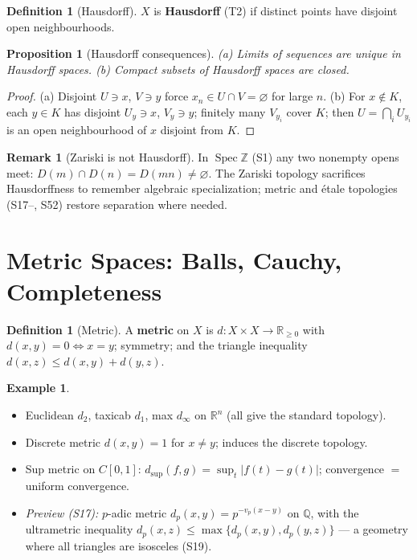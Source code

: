 \documentclass[11pt,a4paper]{article}
\newtheorem{proposition}[theorem]{Proposition}
\theoremstyle{definition}
\newtheorem{definition}[theorem]{Definition}
\newtheorem{example}[theorem]{Example}
\newtheorem{remark}[theorem]{Remark}
\newcommand{\R}{\mathbb{R}}
\newcommand{\Z}{\mathbb{Z}}
\newcommand{\Q}{\mathbb{Q}}
\newcommand{\Spec}{\operatorname{Spec}}
\begin{document}
	\begin{definition}[Hausdorff]
		$X$ is \textbf{Hausdorff} (T2) if distinct points have disjoint open neighbourhoods.
	\end{definition}
	
	\begin{proposition}[Hausdorff consequences]\label{prop:hausdorff}
		(a) Limits of sequences are unique in Hausdorff spaces. (b) Compact subsets of Hausdorff spaces are closed.
	\end{proposition}
	\begin{proof}
		(a) Disjoint $U\ni x$, $V\ni y$ force $x_n\in U\cap V=\varnothing$ for large $n$. (b) For $x\notin K$,
		each $y\in K$ has disjoint $U_y\ni x$, $V_y\ni y$; finitely many $V_{y_i}$ cover $K$; then
		$U=\bigcap_i U_{y_i}$ is an open neighbourhood of $x$ disjoint from $K$.
	\end{proof}
	
	\begin{remark}[Zariski is not Hausdorff]\label{rem:zariski}
		In $\Spec\Z$ (S1) any two nonempty opens meet: $D(m)\cap D(n)=D(mn)\neq\varnothing$. The Zariski
		topology sacrifices Hausdorffness to remember algebraic specialization; metric and \'etale topologies
		(S17--, S52) restore separation where needed.
	\end{remark}
	
	\section{Metric Spaces: Balls, Cauchy, Completeness}
	
	\begin{definition}[Metric]
		A \textbf{metric} on $X$ is $d:X\times X\to\R_{\ge0}$ with $d(x,y)=0\iff x=y$; symmetry; and the
		triangle inequality $d(x,z)\le d(x,y)+d(y,z)$.
	\end{definition}
	
	\begin{example}\label{ex:metrics}
		\begin{itemize}
			\item Euclidean $d_2$, taxicab $d_1$, max $d_\infty$ on $\R^n$ (all give the standard topology).
			\item Discrete metric $d(x,y)=1$ for $x\neq y$; induces the discrete topology.
			\item Sup metric on $C[0,1]$: $d_{\sup}(f,g)=\sup_{t}|f(t)-g(t)|$; convergence $=$ uniform convergence.
			\item \emph{Preview (S17):} $p$-adic metric $d_p(x,y)=p^{-v_p(x-y)}$ on $\Q$, with the ultrametric
			inequality $d_p(x,z)\le\max\{d_p(x,y),d_p(y,z)\}$ --- a geometry where all triangles are isosceles (S19).
		\end{itemize}
	\end{example}
	
\end{document}
